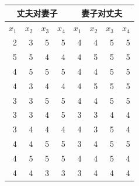 \begin{mvtable}
\label{tab:6.14}
\begin{tabular}{rrrr|rrrr}
\toprule
\multicolumn{4}{c}{丈夫对妻子} & \multicolumn{4}{c}{妻子对丈夫}\\\midrule
$x_1$ & $x_2$ & $x_3$ & $x_4$ & $x_1$ & $x_2$ & $x_3$ & $x_4$\\\midrule
2 & 3 & 5 & 5 & 4 & 4 & 5 & 5\\
5 & 5 & 4 & 4 & 4 & 5 & 5 & 5\\
4 & 5 & 5 & 5 & 4 & 4 & 5 & 5\\
4 & 3 & 4 & 4 & 4 & 5 & 5 & 5\\
3 & 3 & 5 & 5 & 4 & 4 & 5 & 5\\
3 & 3 & 4 & 5 & 3 & 3 & 4 & 4\\
3 & 4 & 4 & 4 & 4 & 3 & 5 & 4\\
4 & 4 & 5 & 5 & 3 & 4 & 5 & 5\\
4 & 5 & 5 & 5 & 4 & 4 & 5 & 4\\
4 & 4 & 3 & 3 & 3 & 4 & 4 & 4\\
\bottomrule
\end{tabular}
\end{mvtable}
